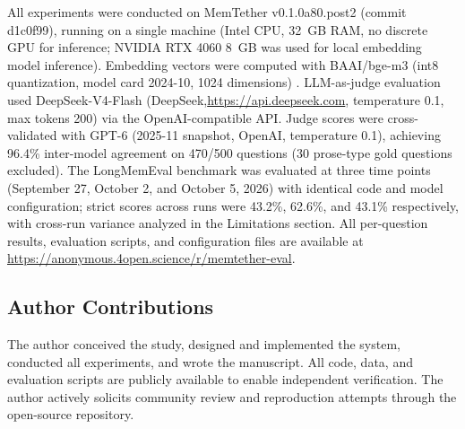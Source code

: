\documentclass[10pt]{article}
\begin{document}
All experiments were conducted on MemTether v0.1.0a80.post2 (commit d1c0f99), running on a single machine (Intel CPU, 32~GB RAM, no discrete GPU for inference; NVIDIA RTX 4060 8~GB was used for local embedding model inference). Embedding vectors were computed with BAAI/bge-m3 (int8 quantization, model card 2024-10, 1024 dimensions) \citep{bge2023}. LLM-as-judge evaluation used DeepSeek-V4-Flash (DeepSeek,\url{https://api.deepseek.com}, temperature 0.1, max tokens 200) via the OpenAI-compatible API. Judge scores were cross-validated with GPT-6 (2025-11 snapshot, OpenAI, temperature 0.1), achieving 96.4\% inter-model agreement on 470/500 questions (30 prose-type gold questions excluded). The LongMemEval benchmark was evaluated at three time points (September 27, October 2, and October 5, 2026) with identical code and model configuration; strict scores across runs were 43.2\%, 62.6\%, and 43.1\% respectively, with cross-run variance analyzed in the Limitations section. All per-question results, evaluation scripts, and configuration files are available at \url{https://anonymous.4open.science/r/memtether-eval}.


\subsection*{Author Contributions}

The author conceived the study, designed and implemented the system, conducted all experiments, and wrote the manuscript. All code, data, and evaluation scripts are publicly available to enable independent verification. The author actively solicits community review and reproduction attempts through the open-source repository.
\end{document}

